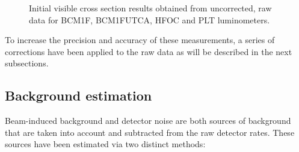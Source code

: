 \begin{figure}[!htb]
	\centering
	\caption[Initial visible cross section for other online luminometers]{Initial visible cross section results obtained from uncorrected, raw data for BCM1F, BCM1FUTCA, HFOC and PLT luminometers.}
	\label{fig:noCorr_luminometer_xsec}
\end{figure}

To increase the precision and accuracy of these measurements, a series of corrections have been applied to the raw data as will be described in the next subsections.

\subsection{Background estimation}

Beam-induced background and detector noise are both sources of background that are taken into account and subtracted from the raw detector rates. These sources have been estimated via two distinct methods:

